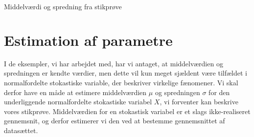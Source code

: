 
\begin{center}
	\Huge
	Middelværdi og spredning fra stikprøve
\end{center}
\section*{Estimation af parametre}

I de eksempler, vi har arbejdet med, har vi antaget, at middelværdien og spredningen er kendte værdier, men dette vil kun meget sjældent være tilfældet i normalfordelte stokastiske variable, der beskriver virkelige fænomener. Vi skal derfor have en måde at estimere middelværdien $\mu$ og spredningen $\sigma$ for den underliggende normalfordelte stokastiske variabel $X$, vi forventer kan beskrive vores stikprøve. Middelværdien for en stokastisk variabel er et slags ikke-realiseret gennemsnit, og derfor estimerer vi den ved at bestemme gennemsnittet af datasættet. 

